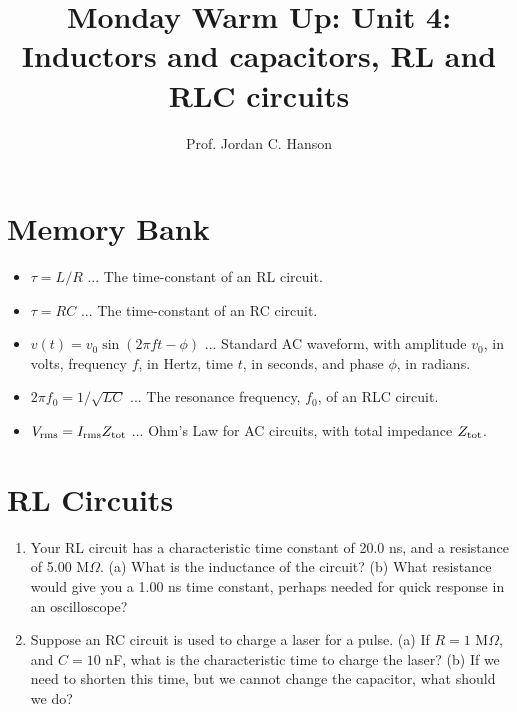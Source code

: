 \documentclass{article}
\begin{document}
\twocolumn
\title{Monday Warm Up: Unit 4: Inductors and capacitors, RL and RLC circuits}
\author{Prof. Jordan C. Hanson}

\maketitle

\section{Memory Bank}

\begin{itemize}
\item $\tau = L/R$ ... The time-constant of an RL circuit.
\item $\tau = RC$ ... The time-constant of an RC circuit.
\item $v(t) = v_0 \sin(2\pi ft - \phi)$ ... Standard AC waveform, with amplitude $v_0$, in volts, frequency $f$, in Hertz, time $t$, in seconds, and phase $\phi$, in radians.
\item $2\pi f_0 = 1/\sqrt{LC}$ ... The resonance frequency, $f_0$, of an RLC circuit.
\item $V_{\rm rms} = I_{\rm rms} Z_{\rm tot}$ ... Ohm's Law for AC circuits, with total impedance $Z_{\rm tot}$.
\end{itemize}

\section{RL Circuits}

\begin{enumerate}
\item Your RL circuit has a characteristic time constant of 20.0 ns, and a resistance of 5.00 M$\Omega$. (a) What is the inductance of the circuit? (b) What resistance would give you a 1.00 ns time constant, perhaps needed for quick response in an oscilloscope? \\ \vspace{2cm}
\item Suppose an RC circuit is used to charge a laser for a pulse.  (a) If $R = 1$ M$\Omega$, and $C = 10$ nF, what is the characteristic time to charge the laser? (b) If we need to shorten this time, but we cannot change the capacitor, what should we do? \\ \vspace{1cm}
\end{enumerate}
\end{document}
